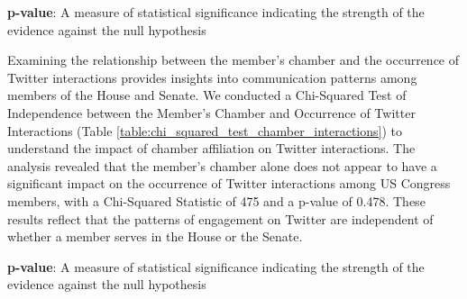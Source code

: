 \documentclass[11pt]{article}
\begin{document}
\begin{table}[h]
\caption{Results of Chi-Square Independence Test for Represented State and Twitter Interactions}
\label{table:chi_squared_test_state_interactions}
\begin{threeparttable}
\renewcommand{\TPTminimum}{\linewidth}
\begin{tablenotes}
\footnotesize
\item \textbf{p-value}: A measure of statistical significance indicating the strength of the evidence against the null hypothesis
\end{tablenotes}
\end{threeparttable}
\end{table}


Examining the relationship between the member's chamber and the occurrence of Twitter interactions provides insights into communication patterns among members of the House and Senate. We conducted a Chi-Squared Test of Independence between the Member's Chamber and Occurrence of Twitter Interactions (Table {}\ref{table:chi_squared_test_chamber_interactions}) to understand the impact of chamber affiliation on Twitter interactions. The analysis revealed that the member's chamber alone does not appear to have a significant impact on the occurrence of Twitter interactions among US Congress members, with a Chi-Squared Statistic of 475 and a p-value of 0.478. These results reflect that the patterns of engagement on Twitter are independent of whether a member serves in the House or the Senate.

\begin{table}[h]
\caption{Results of Chi-Square Independence Test for Chamber and Twitter Interactions}
\label{table:chi_squared_test_chamber_interactions}
\begin{threeparttable}
\renewcommand{\TPTminimum}{\linewidth}
\begin{tablenotes}
\footnotesize
\item \textbf{p-value}: A measure of statistical significance indicating the strength of the evidence against the null hypothesis
\end{tablenotes}
\end{threeparttable}
\end{table}
\end{document}
